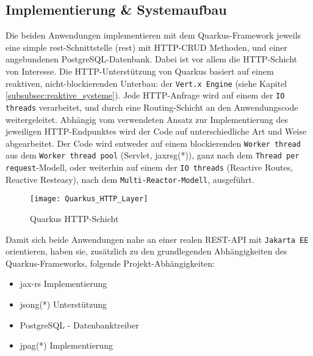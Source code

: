 \subsection{Implementierung \& Systemaufbau}
\label{section:implementierung}
Die beiden Anwendungen implementieren mit dem Quarkus-Framework jeweils eine simple \acrshort{rest}-Schnittstelle (\acrlong{rest})
mit HTTP-CRUD Methoden, und einer angebundenen PostgreSQL-Datenbank.
Dabei ist vor allem die HTTP-Schicht von Interesse. Die HTTP-Unterstützung von Quarkus basiert auf einem reaktiven, nicht-blockierenden
Unterbau: der \verb|Vert.x Engine| (siehe Kapitel \ref{subsubsec:reaktive_systeme}).
Jede HTTP-Anfrage wird auf einem der \verb|IO threads|
verarbeitet, und durch eine Routing-Schicht an den Anwendungscode weitergeleitet.
Abhängig vom verwendeten Ansatz zur Implementierung des jeweiligen HTTP-Endpunktes wird der Code auf unterschiedliche Art und Weise abgearbeitet.
Der Code wird entweder auf einem blockierenden \verb|Worker thread| aus dem \verb|Worker thread pool| (Servlet, \Gls{jaxrsg}(*)),
ganz nach dem \verb|Thread per request|-Modell, oder weiterhin auf einem der \verb|IO threads| (Reactive Routes, Reactive Resteasy),
nach dem \verb|Multi-Reactor-Modell|, ausgeführt.
\newpage
\begin{figure}[h]
  \centering
  \texttt{[image: Quarkus\_HTTP\_Layer]}
  \caption{Quarkus HTTP-Schicht \parencite{QuarkusReactiveRoutes}}
  \label{fig:quarkus_http_schicht}
\end{figure}
Damit sich beide Anwendungen nahe an einer realen REST-API mit \verb|Jakarta EE| orientieren, haben
sie, zusätzlich zu den grundlegenden Abhängigkeiten des Quarkus-Frameworks, folgende Projekt-Abhängigkeiten:
\begin{itemize}
  \item \acrshort{jax-rs} Implementierung
  \item \Gls{jsong}(*) Unterstützung
  \item PostgreSQL - Datenbanktreiber
  \item \Gls{jpag}(*) Implementierung
\end{itemize}

